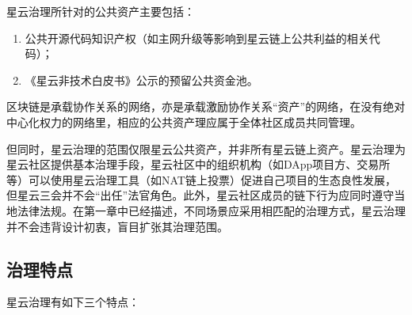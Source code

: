 星云治理所针对的公共资产主要包括：

\begin{enumerate}
	\item 公共开源代码知识产权（如主网升级等影响到星云链上公共利益的相关代码）；
	\item 《星云非技术白皮书》公示的预留公共资金池。
\end{enumerate}

区块链是承载协作关系的网络，亦是承载激励协作关系“资产”的网络，在没有绝对中心化权力的网络里，相应的公共资产理应属于全体社区成员共同管理。

但同时，星云治理的范围仅限星云公共资产，并非所有星云链上资产。星云治理为星云社区提供基本治理手段，星云社区中的组织机构（如DApp项目方、交易所等）可以使用星云治理工具（如NAT链上投票）促进自己项目的生态良性发展，但星云三会并不会“出任”法官角色。此外，星云社区成员的链下行为应同时遵守当地法律法规。在第一章中已经描述，不同场景应采用相匹配的治理方式，星云治理并不会违背设计初衷，盲目扩张其治理范围。

\subsection{治理特点}

星云治理有如下三个特点：

